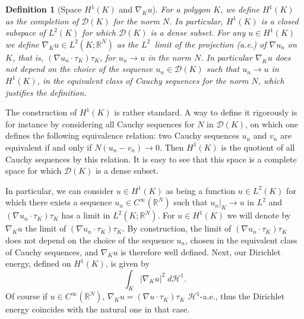 \documentclass[12pt,english]{smfart} %
\newtheorem{definition}[theorem]{Definition}
\theoremstyle{remark}
\newcommand{\R}{\mathbb{R}}
\begin{document}
\medskip\begin{definition}[Space $H^1(K)$ and $\nabla_K u$] For a polygon $K$, we define $H^1(K)$ as the completion of $\mathcal{D}(K)$ for the norm $N$. In particular, $H^1(K)$ is a closed subspace of $L^2(K)$ for which $\mathcal{D}(K)$ is a dense subset. For any $u \in H^1(K)$ we define $\nabla_K u \in L^2(K;\R^N)$ as the $L^2$~limit of the projection (a.e.) of $\nabla u_n$ on $K$, that is, $(\nabla u_n\cdot \tau_K)\tau_K$, for $u_n \to u$ in the norm $N$. In particular $\nabla_K u$ does not depend on the choice of the sequence $u_n \in \mathcal{D}(K)$  such that $u_n \to u$ in $H^1(K)$, in the equivalent class of Cauchy sequences for the norm $N$, which justifies the definition.
\end{definition}

The construction of $H^1(K)$ is rather standard. A way to define it rigorously  is for instance by considering all Cauchy sequences for $N$ in $\mathcal{D}(K)$, on which one defines the following equivalence relation: two Cauchy sequences $u_n$ and $v_n$ are equivalent if and only if $N(u_n-v_n)\to 0$. Then $H^1(K)$ is the quotient of all Cauchy sequences by this relation. It is easy to see  that this space is a complete space for which $\mathcal{D}(K)$ is a dense subset. 

  In particular, we can consider  $u \in H^1(K)$ as being a function $u\in L^2(K)$ for which there exists a sequence $u_n \in C^\infty(\R^N)$ such that $u_n\vert_K \to u$ in $L^2$ and   $(\nabla u_n \cdot \tau_K)\tau_K$ has a limit in $L^2(K;\R^N)$. For $u \in H^1(K)$ we will denote by $\nabla_K u$ the  limit  of $(\nabla u_n \cdot \tau_K)\tau_K$. By construction,  the limit of $(\nabla u_n \cdot \tau_K)\tau_K$ does not depend on the choice of the sequence $u_n$, chosen in the equivalent class of Cauchy sequences, and $\nabla_K u$ is therefore well defined. Next, our Dirichlet energy, defined on $H^1(K)$, is given by
$$\int_{K} |\nabla_K u|^2 \;d\mathcal{H}^1.$$
Of course if $u\in  C^\infty(\R^N)$, $\nabla_K u = (\nabla u \cdot \tau_K)\tau_K$ $\mathcal{H}^1$-a.e., thus the Dirichlet energy coincides with the natural one in that case.   
 
 

\end{document}
